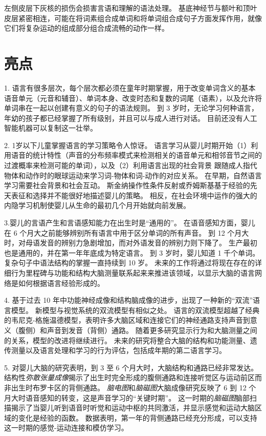 左侧皮层下灰核的损伤会损害言语和理解的语法处理。
基底神经节与额叶和顶叶皮层紧密相连，可能在将词素组合成单词和将单词组合成句子方面发挥作用，就像它们将复杂运动的组成部分组合成流畅的动作一样。



\section{亮点}

1. 语言有很多层次，每个层次都必须在童年时期掌握，用于改变单词含义的基本语音单元（元音和辅音）、单词本身、改变时态和复数的词尾（语素），以及允许将单词串在一起以创建有意义的句子的语法规则。
到 3 岁时，无论学习何种语言，年幼的孩子都已经掌握了所有级别，并且可以与成人进行对话。
目前还没有人工智能机器可以复制这一壮举。 


2. 1岁以下儿童掌握语言的学习策略令人惊讶。
语言学习从婴儿时期开始（1）利用语音的统计特性（声音的分布频率模式来检测相关的语音单元和相邻音节之间的过渡概率来检测可能的单词），以及（2）利用语言出现的社会背景 跟随成人指代物体和动作时的眼球运动来学习词-物体和词-动作的对应关系。
在早期，自然语言学习需要社会背景和社会互动。
斯金纳操作性条件反射或乔姆斯基基于经验的先天表征和选择并不能很好地描述婴儿的策略。
相反，在社会环境中运作的强大的内隐学习机制使婴儿从生命的最初几个月开始就向前发展。


3.婴儿的言语产生和言语感知能力在出生时是“通用的”。
在语音感知方面，婴儿在 6 个月大之前能够辨别所有语言中用于区分单词的所有声音。
到 12 个月大时，对母语发音的辨别力急剧增加，而对外语发音的辨别力则下降了。
生产最初也是通用的，并在第一年年底成为特定语言。
到 3 岁时，婴儿知道 1 千个单词。
复杂句子中语法结构的掌握一直持续到 10 岁。
未来的工作将通过将现在存在的详细行为里程碑与功能和结构大脑测量联系起来来推进该领域，以显示大脑的语言网络是如何根据语言经验形成的。 


4. 基于过去 10 年中功能神经成像和结构脑成像的进步，出现了一种新的“双流”语言模型。
新模型与视觉系统的双流模型有相似之处。
语言的双流模型超越了经典的韦尼克-格施温德模型，表明许多大脑区域和连接它们的神经通路支持声音到意义（腹侧）和声音到发音（背侧）通路。
随着更多研究显示行为和大脑测量之间的关系，模型的改进将继续进行。
未来的研究将整合大脑的结构和功能测量、遗传测量以及语言处理和学习的行为评估，包括成年期的第二语言学习。


5. 对婴儿大脑的研究表明，到 3 至 6 个月大时，大脑结构和通路已经非常发达。
结构性\textit{弥散张量成像}揭示了出生时完全形成的腹侧通路和连接听觉区与运动前区而非出生时布罗卡区的背侧通路。
\textit{脑电图}和\textit{脑磁图}大脑成像研究反映了 6 到 12 个月大时语音感知的转变，这是声音学习的“关键时期”。
这一时期的\textit{脑磁图}脑部扫描揭示了当婴儿听到语音时听觉和运动中枢的共同激活，并显示感觉和运动大脑区域的变化是经验的函数。
数据表明，第一年的背侧通路已经充分形成，可以支持这一时期的感觉-运动连接和模仿学习。


